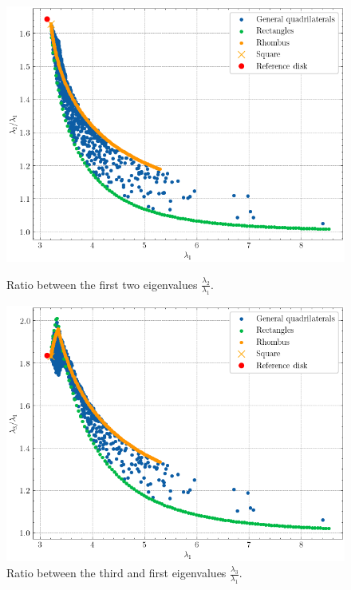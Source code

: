 \begin{figure}[!htb]
    \begin{minipage}[c]{0.45\textwidth}
        \centering
        \includegraphics[width=\textwidth]{Images/Dirac/quad/benguria_quad.png}
        \captionsetup{width=0.8\linewidth} %
        \caption{Ratio between the first two eigenvalues \(\frac{\lambda_2}{\lambda_1}\).}
        \label{dirac_benguria_quad}
    \end{minipage}
    \hfill
    \begin{minipage}[c]{0.45\textwidth}
        \centering
        \includegraphics[width=\textwidth]{Images/Dirac/quad/generalized_benguria_quad.png}
        \captionsetup{width=0.8\linewidth} %
        \caption{Ratio between the third and first eigenvalues \(\frac{\lambda_3}{\lambda_1}\).}
        \label{dirac_generalized_benguria_quad}
    \end{minipage}
    \vspace{0.5cm}
\end{figure}

